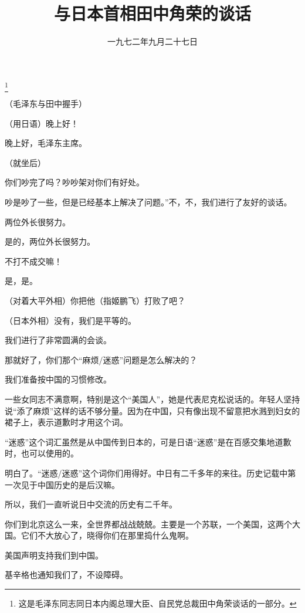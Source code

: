 
\title{与日本首相田中角荣的谈话}
\date{一九七二年九月二十七日}
\thanks{这是毛泽东同志同日本内阁总理大臣、自民党总裁田中角荣谈话的一部分。}
\maketitle


（毛泽东与田中握手）

（用日语）晚上好！

晚上好，毛泽东主席。

（就坐后）

你们吵完了吗？吵吵架对你们有好处。

吵是吵了一些，但是已经基本上解决了问题。”不，不，我们进行了友好的谈话。

两位外长很努力。

是的，两位外长很努力。

不打不成交嘛！

是，是。

（对着大平外相）你把他（指姬鹏飞）打败了吧？

（日本外相）没有，我们是平等的。

我们进行了非常圆满的会谈。

那就好了，你们那个“麻烦/{\mingchao 迷惑}”问题是怎么解决的？

我们准备按中国的习惯修改。

一些女同志不满意啊，特别是这个“美国人”，她是代表尼克松说话的。年轻人坚持说“添了麻烦”这样的话不够分量。因为在中国，只有像出现不留意把水溅到妇女的裙子上，表示道歉时才用这个词。

“{\mingchao 迷惑}”这个词汇虽然是从中国传到日本的，可是日语“{\mingchao 迷惑}”是在百感交集地道歉时，也可以使用的。

明白了。“迷惑/{\mingchao 迷惑}”这个词你们用得好。中日有二千多年的来往。历史记载中第一次见于中国历史的是后汉嘛。

所以，我们一直听说日中交流的历史有二千年。

你们到北京这么一来，全世界都战战兢兢。主要是一个苏联，一个美国，这两个大国。它们不大放心了，晓得你们在那里捣什么鬼啊。

美国声明支持我们到中国。

基辛格也通知我们了，不设障碍。

